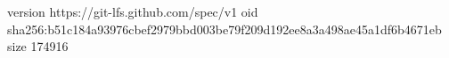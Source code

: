 version https://git-lfs.github.com/spec/v1
oid sha256:b51c184a93976cbef2979bbd003be79f209d192ee8a3a498ae45a1df6b4671eb
size 174916
